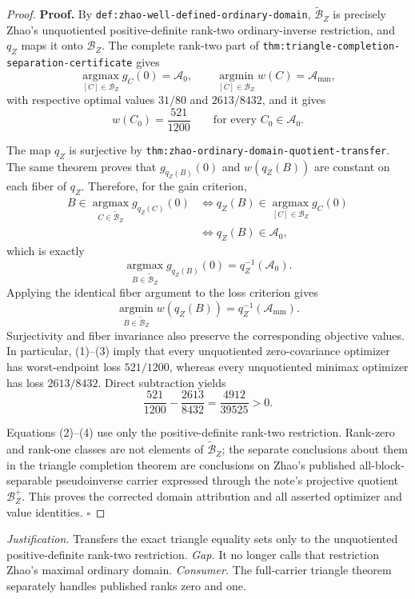 \documentclass{article}
\begin{document}
\begin{proof}
\textbf{Proof.}
By \texttt{def:zhao-well-defined-ordinary-domain}, \(\widetilde{\mathcal B}_Z\) is precisely Zhao's unquotiented positive-definite rank-two ordinary-inverse restriction, and \(q_Z\) maps it onto \(\mathcal B_Z\).  The complete rank-two part of \texttt{thm:triangle-completion-separation-certificate} gives
\[
\operatorname*{argmax}_{[C]\in\mathcal B_Z}g_C(0)=\mathcal A_0,
\qquad
\operatorname*{argmin}_{[C]\in\mathcal B_Z}w(C)=\mathcal A_{\mathrm{mm}},
\]
with respective optimal values \(31/80\) and \(2613/8432\), and it gives
\[
w(C_0)=\frac{521}{1200}
\qquad\text{for every }C_0\in\mathcal A_0.
\tag{1}
\]

The map \(q_Z\) is surjective by \texttt{thm:zhao-ordinary-domain-quotient-transfer}.  The same theorem proves that \(g_{q_Z(B)}(0)\) and \(w(q_Z(B))\) are constant on each fiber of \(q_Z\).  Therefore, for the gain criterion,
\[
\begin{aligned}
B\in\operatorname*{argmax}_{C\in\widetilde{\mathcal B}_Z}g_{q_Z(C)}(0)
&\Longleftrightarrow
q_Z(B)\in\operatorname*{argmax}_{[C]\in\mathcal B_Z}g_C(0)\\
&\Longleftrightarrow q_Z(B)\in\mathcal A_0,
\end{aligned}
\]
which is exactly
\[
\operatorname*{argmax}_{B\in\widetilde{\mathcal B}_Z}g_{q_Z(B)}(0)
=q_Z^{-1}(\mathcal A_0).
\tag{2}
\]
Applying the identical fiber argument to the loss criterion gives
\[
\operatorname*{argmin}_{B\in\widetilde{\mathcal B}_Z}w(q_Z(B))
=q_Z^{-1}(\mathcal A_{\mathrm{mm}}).
\tag{3}
\]
Surjectivity and fiber invariance also preserve the corresponding objective values.  In particular, (1)--(3) imply that every unquotiented zero-covariance optimizer has worst-endpoint loss \(521/1200\), whereas every unquotiented minimax optimizer has loss \(2613/8432\).  Direct subtraction yields
\[
\frac{521}{1200}-\frac{2613}{8432}
=\frac{4912}{39525}>0.
\tag{4}
\]

Equations (2)--(4) use only the positive-definite rank-two restriction.  Rank-zero and rank-one classes are not elements of \(\widetilde{\mathcal B}_Z\); the separate conclusions about them in the triangle completion theorem are conclusions on Zhao's published all-block-separable pseudoinverse carrier expressed through the note's projective quotient \(\mathcal B_Z^+\).  This proves the corrected domain attribution and all asserted optimizer and value identities. \(\square\)
\end{proof}
\par\smallskip\noindent \textit{Justification.} Transfers the exact triangle equality sets only to the unquotiented positive-definite rank-two restriction. \textit{Gap.} It no longer calls that restriction Zhao's maximal ordinary domain. \textit{Consumer.} The full-carrier triangle theorem separately handles published ranks zero and one.
\end{document}

